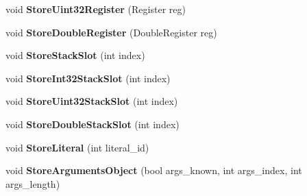 \begin{DoxyCompactItemize}
\item 
\hypertarget{classv8_1_1internal_1_1_b_a_s_e___e_m_b_e_d_d_e_d_ab6509c159adde46c440439dfa8b35c98}{}void {\bfseries Store\+Uint32\+Register} (Register reg)\label{classv8_1_1internal_1_1_b_a_s_e___e_m_b_e_d_d_e_d_ab6509c159adde46c440439dfa8b35c98}

\item 
\hypertarget{classv8_1_1internal_1_1_b_a_s_e___e_m_b_e_d_d_e_d_ad8372021d1770c97dc07ba9d78a77111}{}void {\bfseries Store\+Double\+Register} (Double\+Register reg)\label{classv8_1_1internal_1_1_b_a_s_e___e_m_b_e_d_d_e_d_ad8372021d1770c97dc07ba9d78a77111}

\item 
\hypertarget{classv8_1_1internal_1_1_b_a_s_e___e_m_b_e_d_d_e_d_ab9a3c2f46e37d322973ab44aa7abb583}{}void {\bfseries Store\+Stack\+Slot} (int index)\label{classv8_1_1internal_1_1_b_a_s_e___e_m_b_e_d_d_e_d_ab9a3c2f46e37d322973ab44aa7abb583}

\item 
\hypertarget{classv8_1_1internal_1_1_b_a_s_e___e_m_b_e_d_d_e_d_afcbec8abe370e618e77fa4cba655e98b}{}void {\bfseries Store\+Int32\+Stack\+Slot} (int index)\label{classv8_1_1internal_1_1_b_a_s_e___e_m_b_e_d_d_e_d_afcbec8abe370e618e77fa4cba655e98b}

\item 
\hypertarget{classv8_1_1internal_1_1_b_a_s_e___e_m_b_e_d_d_e_d_a8896c1e82d4e473a9266bb8ed2939856}{}void {\bfseries Store\+Uint32\+Stack\+Slot} (int index)\label{classv8_1_1internal_1_1_b_a_s_e___e_m_b_e_d_d_e_d_a8896c1e82d4e473a9266bb8ed2939856}

\item 
\hypertarget{classv8_1_1internal_1_1_b_a_s_e___e_m_b_e_d_d_e_d_a729f6c7a7b2b206a63acfd09559aadda}{}void {\bfseries Store\+Double\+Stack\+Slot} (int index)\label{classv8_1_1internal_1_1_b_a_s_e___e_m_b_e_d_d_e_d_a729f6c7a7b2b206a63acfd09559aadda}

\item 
\hypertarget{classv8_1_1internal_1_1_b_a_s_e___e_m_b_e_d_d_e_d_a1ba935c417f13c054e301406de87fbcf}{}void {\bfseries Store\+Literal} (int literal\+\_\+id)\label{classv8_1_1internal_1_1_b_a_s_e___e_m_b_e_d_d_e_d_a1ba935c417f13c054e301406de87fbcf}

\item 
\hypertarget{classv8_1_1internal_1_1_b_a_s_e___e_m_b_e_d_d_e_d_a5fd89849ea53f641240c2b9368d9b059}{}void {\bfseries Store\+Arguments\+Object} (bool args\+\_\+known, int args\+\_\+index, int args\+\_\+length)\label{classv8_1_1internal_1_1_b_a_s_e___e_m_b_e_d_d_e_d_a5fd89849ea53f641240c2b9368d9b059}


\end{DoxyCompactItemize}
